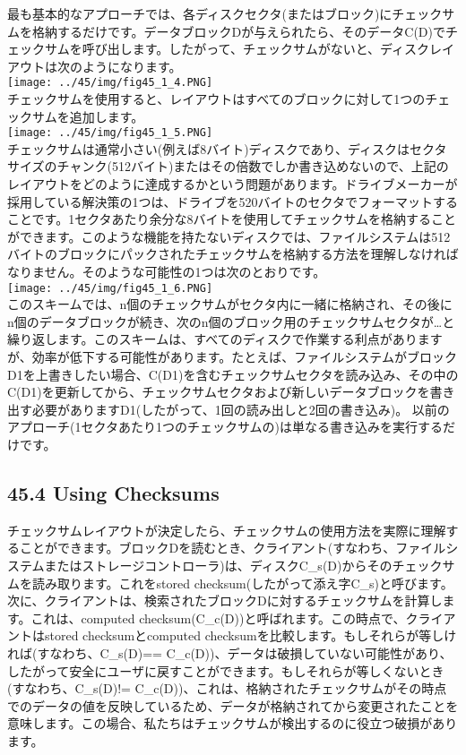 最も基本的なアプローチでは、各ディスクセクタ(またはブロック)にチェックサムを格納するだけです。データブロックDが与えられたら、そのデータC(D)でチェックサムを呼び出します。したがって、チェックサムがないと、ディスクレイアウトは次のようになります。\\
\texttt{[image: ../45/img/fig45\_1\_4.PNG]}\\
チェックサムを使用すると、レイアウトはすべてのブロックに対して1つのチェックサムを追加します。\\
\texttt{[image: ../45/img/fig45\_1\_5.PNG]}\\
チェックサムは通常小さい(例えば8バイト)ディスクであり、ディスクはセクタサイズのチャンク(512バイト)またはその倍数でしか書き込めないので、上記のレイアウトをどのように達成するかという問題があります。ドライブメーカーが採用している解決策の1つは、ドライブを520バイトのセクタでフォーマットすることです。1セクタあたり余分な8バイトを使用してチェックサムを格納することができます。このような機能を持たないディスクでは、ファイルシステムは512バイトのブロックにパックされたチェックサムを格納する方法を理解しなければなりません。そのような可能性の1つは次のとおりです。\\
\texttt{[image: ../45/img/fig45\_1\_6.PNG]}\\
このスキームでは、n個のチェックサムがセクタ内に一緒に格納され、その後にn個のデータブロックが続き、次のn個のブロック用のチェックサムセクタが\ldots と繰り返します。このスキームは、すべてのディスクで作業する利点がありますが、効率が低下する可能性があります。たとえば、ファイルシステムがブロックD1を上書きしたい場合、C(D1)を含むチェックサムセクタを読み込み、その中のC(D1)を更新してから、チェックサムセクタおよび新しいデータブロックを書き出す必要がありますD1(したがって、1回の読み出しと2回の書き込み)。
以前のアプローチ(1セクタあたり1つのチェックサムの)は単なる書き込みを実行するだけです。

\hypertarget{using-checksums}{%
\subsection*{45.4 Using Checksums}\label{using-checksums}}

チェックサムレイアウトが決定したら、チェックサムの使用方法を実際に理解することができます。ブロックDを読むとき、クライアント(すなわち、ファイルシステムまたはストレージコントローラ)は、ディスクC\_s(D)からそのチェックサムを読み取ります。これをstored
checksum(したがって添え字C\_s)と呼びます。次に、クライアントは、検索されたブロックDに対するチェックサムを計算します。これは、computed
checksum(C\_c(D))と呼ばれます。この時点で、クライアントはstored
checksumとcomputed
checksumを比較します。もしそれらが等しければ(すなわち、C\_s(D)==
C\_c(D))、データは破損していない可能性があり、したがって安全にユーザに戻すことができます。もしそれらが等しくないとき(すなわち、C\_s(D)!=
C\_c(D))、これは、格納されたチェックサムがその時点でのデータの値を反映しているため、データが格納されてから変更されたことを意味します。この場合、私たちはチェックサムが検出するのに役立つ破損があります。

